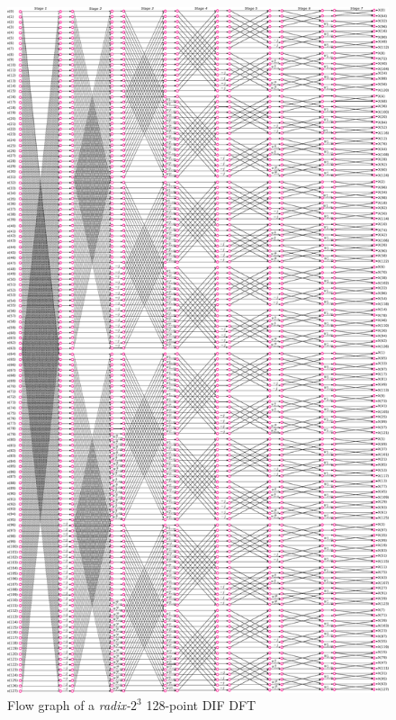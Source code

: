 \documentclass[journal,comsoc]{IEEEtran}
\begin{document}
\begin{figure} 
	\centering
	\includegraphics[width=\linewidth]{Diagramas/miSeccionFiguras/128PuntosRadix8Conexion.pdf}
	\caption{Flow graph of a \textit{radix-}$2^3$ 128-point DIF DFT}
	\label{fig:128points_conn}
\end{figure}



 
\end{document}
